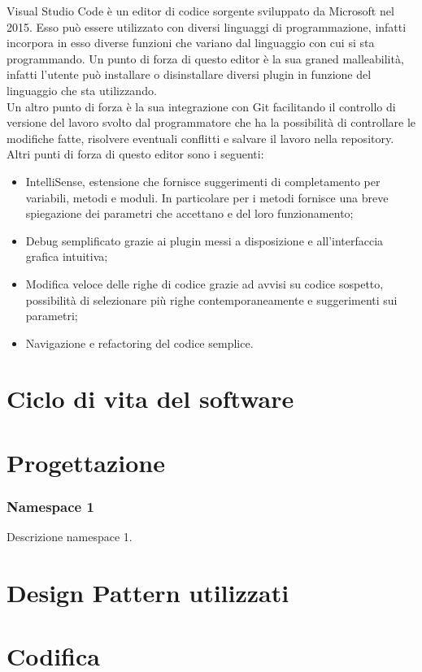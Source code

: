 Visual Studio Code è un editor di codice sorgente sviluppato da Microsoft nel 2015. Esso può essere utilizzato con diversi linguaggi di programmazione, infatti incorpora in esso diverse funzioni che variano dal linguaggio con cui si sta programmando. Un punto di forza di questo editor è la sua graned malleabilità, infatti l'utente può installare o disinstallare diversi plugin in funzione del linguaggio che sta utilizzando.\\
Un altro punto di forza è la sua integrazione con Git facilitando il controllo di versione del lavoro svolto dal programmatore che ha la possibilità di controllare le modifiche fatte, risolvere eventuali conflitti e salvare il lavoro nella repository. Altri punti di forza di questo editor sono i seguenti:
\begin{itemize}
	\item IntelliSense, estensione che fornisce suggerimenti di completamento per variabili, metodi e moduli. In particolare per i metodi fornisce una breve spiegazione dei parametri che accettano e del loro funzionamento;
	\item Debug semplificato grazie ai plugin messi a disposizione e all'interfaccia grafica intuitiva;
	\item Modifica veloce delle righe di codice grazie ad avvisi su codice sospetto, possibilità di selezionare più righe contemporaneamente e suggerimenti sui parametri;
	\item Navigazione e refactoring del codice semplice.
\end{itemize}

\section{Ciclo di vita del software}
\label{sec:ciclo-vita-software}

\section{Progettazione}
\label{sec:progettazione}

\subsubsection{Namespace 1} %
Descrizione namespace 1.

\begin{namespacedesc}
\end{namespacedesc}


\section{Design Pattern utilizzati}

\section{Codifica}
